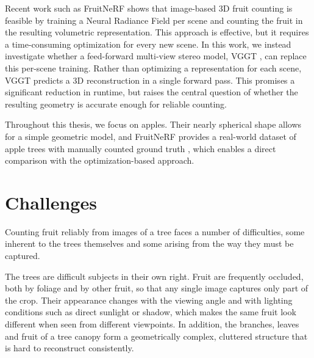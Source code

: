 \documentclass[english, egger, bsc]{vcethesis}
\begin{document}
Recent work such as FruitNeRF \cite{meyer2024fruitnerf} shows that image-based 3D fruit counting is feasible by training a Neural Radiance Field \cite{mildenhall2020nerf} per scene and counting the fruit in the resulting volumetric representation. This approach is effective, but it requires a time-consuming optimization for every new scene. In this work, we instead investigate whether a feed-forward multi-view stereo model, VGGT \cite{wang2025vggt}, can replace this per-scene training. Rather than optimizing a representation for each scene, VGGT predicts a 3D reconstruction in a single forward pass. This promises a significant reduction in runtime, but raises the central question of whether the resulting geometry is accurate enough for reliable counting.

Throughout this thesis, we focus on apples. Their nearly spherical shape allows for a simple geometric model, and FruitNeRF provides a real-world dataset of apple trees with manually counted ground truth \cite{meyer2024fruitnerf}, which enables a direct comparison with the optimization-based approach.

\section{Challenges}
\label{sec:challenges}

Counting fruit reliably from images of a tree faces a number of difficulties, some inherent to the trees themselves and some arising from the way they must be captured.

The trees are difficult subjects in their own right. Fruit are frequently occluded, both by foliage and by other fruit, so that any single image captures only part of the crop. Their appearance changes with the viewing angle and with lighting conditions such as direct sunlight or shadow, which makes the same fruit look different when seen from different viewpoints. In addition, the branches, leaves and fruit of a tree canopy form a geometrically complex, cluttered structure that is hard to reconstruct consistently.
\end{document}
